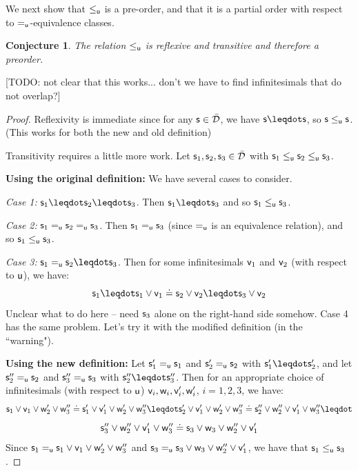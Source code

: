 \documentclass[10pt, onecolumn, nofootinbib]{revtex4-1}
\newtheorem{conj}[equation]{Conjecture}
\begin{document}
We next show that $\lequ$ is a pre-order, and that it is a partial order with respect to $\equ$-equivalence classes. 

\begin{conj}
	The relation $\lequ$ is reflexive and transitive and therefore a preorder.
\end{conj}

[TODO: not clear that this works... don't we have to find infinitesimals that do not overlap?]
\begin{proof}
	Reflexivity is immediate since for any $\stmt\in\tdomain$, we have $\stmt\finer\stmt$, so $\stmt\lequ\stmt$. (This works for both the new and old definition)
	
	Transitivity requires a little more work. Let $\stmt_1,\stmt_2,\stmt_3\in\tdomain$ with $\stmt_1\lequ\stmt_2\lequ\stmt_3$. 
	
	{\bf Using the original definition:}
	We have several cases to consider. 
	
	\emph{Case 1:} $\stmt_1\finer\stmt_2\finer\stmt_3$. Then $\stmt_1\finer\stmt_3$ and so $\stmt_1\lequ\stmt_3$. 
	
	\emph{Case 2:} $\stmt_1\equ\stmt_2\equ\stmt_3$. Then $\stmt_1\equ\stmt_3$ (since $\equ$ is an equivalence relation), and so $\stmt_1\lequ\stmt_3$. 
	
	\emph{Case 3:} $\stmt_1\equ\stmt_2\finer\stmt_3$. Then for some infinitesimals $\stmt[v]_1$ and $\stmt[v]_2$ (with respect to $\stmt[u]$), we have:
	$$
	\stmt_1\finer\stmt_1\OR\stmt[v]_1\eqgran\stmt_2\OR\stmt[v]_2\finer\stmt_3\OR\stmt[v]_2
	$$
	Unclear what to do here -- need $\stmt_3$ alone on the right-hand side somehow. Case 4 has the same problem. Let's try it with the modified definition (in the ``warning").
	
	{\bf Using the new definition:}
	Let $\stmt_1'\equ\stmt_1$ and $\stmt_2'\equ\stmt_2$ with $\stmt_1'\finer\stmt_2'$, and let $\stmt_2''\equ\stmt_2$ and $\stmt_3''\equ\stmt_3$ with $\stmt_2''\finer\stmt_3''$. 
	Then for an appropriate choice of infinitesimals (with respect to $\stmt[u]$) $\stmt[v]_i,\stmt[w]_i,\stmt[v]_i',\stmt[w]_i'$, $i=1,2,3$, we have:
	$$
	\stmt_1\OR\stmt[v]_1\OR\stmt[w]_2'\OR\stmt[w]_3'' \eqgran \stmt_1'\OR\stmt[v]_1'\OR\stmt[w]_2'\OR\stmt[w]_3'' \finer \stmt_2'\OR\stmt[v]_1'\OR\stmt[w]_2'\OR\stmt[w]_3'' \eqgran \stmt_2''\OR\stmt[w]_2''\OR\stmt[v]_1'\OR\stmt[w]_3'' \finer
	$$
	$$
	\stmt_3''\OR\stmt[w]_2''\OR\stmt[v]_1'\OR\stmt[w]_3'' \eqgran
	\stmt_3\OR\stmt[w]_3 \OR\stmt[w]_2''\OR\stmt[v]_1'
	$$
	Since $\stmt_1 \equ \stmt_1\OR\stmt[v]_1\OR\stmt[w]_2'\OR\stmt[w]_3''$ and $\stmt_3 \equ \stmt_3\OR\stmt[w]_3 \OR\stmt[w]_2''\OR\stmt[v]_1' $, we have that $\stmt_1\lequ\stmt_3$. 
	
\end{proof}
\end{document}
